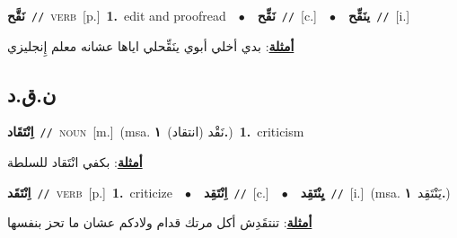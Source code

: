 \documentclass[10pt,a4paper,twoside]{article} %
\begin{document}
\begin{multicols}{2}
{\setlength\topsep{0pt}\textbf{\foreignlanguage{arabic}{نَقَّح}}\ {\color{gray}\texttt{//}\color{black}}\ \textsc{verb}\ [p.]\ \textbf{1.}~edit and proofread\ \ $\bullet$\ \ \setlength\topsep{0pt}\textbf{\foreignlanguage{arabic}{نَقِّح}}\ {\color{gray}\texttt{//}\color{black}}\ [c.]\ \ $\bullet$\ \ \setlength\topsep{0pt}\textbf{\foreignlanguage{arabic}{ينَقِّح}}\ {\color{gray}\texttt{//}\color{black}}\ [i.]\  \begin{flushright}\color{gray}\foreignlanguage{arabic}{\textbf{\underline{\foreignlanguage{arabic}{أمثلة}}}: بدي أخلي أبوي ينَقِّحلي اياها عشانه معلم إِنجليزي}\end{flushright}\color{black}} \vspace{2mm}

\vspace{-3mm}
\subsection*{\color{blue}\foreignlanguage{arabic}{ن.ق.د}\color{blue}{}} 

{\setlength\topsep{0pt}\textbf{\foreignlanguage{arabic}{اِنْتَقَاد}}\ {\color{gray}\texttt{//}\color{black}}\ \textsc{noun}\ [m.]\ \color{gray}(msa. \foreignlanguage{arabic}{نَقْد (انتقاد)}~\foreignlanguage{arabic}{\textbf{١.}})\color{black}\ \textbf{1.}~criticism\  \begin{flushright}\color{gray}\foreignlanguage{arabic}{\textbf{\underline{\foreignlanguage{arabic}{أمثلة}}}: بكفي انْتَقاد للسلطة}\end{flushright}\color{black}} \vspace{2mm}

{\setlength\topsep{0pt}\textbf{\foreignlanguage{arabic}{اِنْتَقَد}}\ {\color{gray}\texttt{//}\color{black}}\ \textsc{verb}\ [p.]\ \textbf{1.}~criticize\ \ $\bullet$\ \ \setlength\topsep{0pt}\textbf{\foreignlanguage{arabic}{اِنْتَقِد}}\ {\color{gray}\texttt{//}\color{black}}\ [c.]\ \ $\bullet$\ \ \setlength\topsep{0pt}\textbf{\foreignlanguage{arabic}{يِنْتَقِد}}\ {\color{gray}\texttt{//}\color{black}}\ [i.]\ \color{gray}(msa. \foreignlanguage{arabic}{يَنْتَقِد}~\foreignlanguage{arabic}{\textbf{١.}})\color{black}\  \begin{flushright}\color{gray}\foreignlanguage{arabic}{\textbf{\underline{\foreignlanguage{arabic}{أمثلة}}}: تنتقَدِش أكل مرتك قدام ولادكم عشان ما تحز بنفسها}\end{flushright}\color{black}} \vspace{2mm}


\end{multicols}
\end{document}
